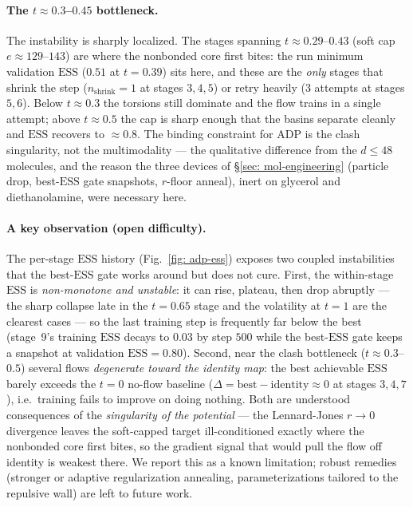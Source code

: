 \documentclass[11pt]{article}
\providecommand{\ESS}{\mathrm{ESS}}
\begin{document}
\paragraph{The $t \approx 0.3$--$0.45$ bottleneck.} The instability is sharply localized. The stages spanning
$t \approx 0.29$--$0.43$ (soft cap $e \approx 129$--$143$) are where the nonbonded core first bites: the run
minimum validation $\ESS$ ($0.51$ at $t = 0.39$) sits here, and these are the \emph{only} stages that shrink
the step ($n_{\mathrm{shrink}} = 1$ at stages $3,4,5$) or retry heavily (3 attempts at stages $5,6$). Below
$t \approx 0.3$ the torsions still dominate and the flow trains in a single attempt; above $t \approx 0.5$ the
cap is sharp enough that the basins separate cleanly and $\ESS$ recovers to ${\approx}0.8$. The binding
constraint for ADP is the clash singularity, not the multimodality --- the qualitative difference from the
$d \le 48$ molecules, and the reason the three devices of \S\ref{sec: mol-engineering} (particle drop,
best-$\ESS$ gate snapshots, $r$-floor anneal), inert on glycerol and diethanolamine, were necessary here.

\paragraph{A key observation (open difficulty).} The per-stage $\ESS$ history (Fig.~\ref{fig: adp-ess})
exposes two coupled instabilities that the best-$\ESS$ gate works around but does not cure. First, the
within-stage $\ESS$ is \emph{non-monotone and unstable}: it can rise, plateau, then drop abruptly --- the sharp
collapse late in the $t = 0.65$ stage and the volatility at $t = 1$ are the clearest cases --- so the last
training step is frequently far below the best (stage~9's training $\ESS$ decays to $0.03$ by step $500$ while
the best-$\ESS$ gate keeps a snapshot at validation $\ESS = 0.80$). Second, near the clash bottleneck ($t \approx 0.3$--$0.5$)
several flows \emph{degenerate toward the identity map}: the best achievable $\ESS$ barely exceeds the $t = 0$
no-flow baseline ($\Delta = \text{best} - \text{identity} \approx 0$ at stages $3, 4, 7$), i.e.\ training fails
to improve on doing nothing. Both are understood consequences of the \emph{singularity of the potential} ---
the Lennard-Jones $r \to 0$ divergence leaves the soft-capped target ill-conditioned exactly where the
nonbonded core first bites, so the gradient signal that would pull the flow off identity is weakest there. We
report this as a known limitation; robust remedies (stronger or adaptive regularization annealing,
parameterizations tailored to the repulsive wall) are left to future work.
\end{document}
